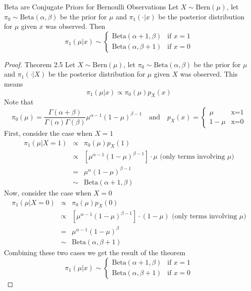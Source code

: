 \documentclass[11pt,a4paper]{article}
\begin{document}
  \begin{theorem}{Beta are Conjugate Priors for Bernoulli Observations}
    Let $X\sim\text{Bern}(\mu)$, let $\pi_0\sim\text{Beta}(\alpha,\beta)$ be the prior for $\mu$ and $\pi_1(\cdot|x)$ be the posterior distribution for $\mu$ given $x$ was observed. Then
    \[ \pi_1(\mu|x)\sim\begin{cases}\text{Beta}(\alpha+1,\beta)&\text{if }x=1\\\text{Beta}(\alpha,\beta+1)&\text{if }x=0\end{cases} \]
  \end{theorem}

  \begin{proof}{Theorem 2.5}
    Let $X\sim\text{Bern}(\mu)$, let $\pi_0\sim\text{Beta}(\alpha,\beta)$ be the prior for $\mu$ and $\pi_1(\cdot|X)$ be the posterior distribution for $\mu$ given $X$ was observed. This means
    \[ \pi_1(\mu|x)\propto\pi_0(\mu)p_X(x) \]
    Note that
    \[ \pi_0(\mu)=\frac{\Gamma(\alpha+\beta)}{\Gamma(\alpha)\Gamma(\beta)}\mu^{\alpha-1}(1-\mu)^{\beta-1}\quad\text{and}\quad p_X(x)=\begin{cases}\mu&\text{x=1}\\1-\mu&\text{x=0}\end{cases} \]
    First, consider the case when $X=1$
    \[\begin{array}{rcl}
      \pi_1(\mu|X=1)&\propto&\pi_0(\mu)p_X(1)\\
      &\propto&[\mu^{\alpha-1}(1-\mu)^{\beta-1}]\cdot\mu\text{ (only terms involving $\mu$)}\\
      &=&\mu^\alpha(1-\mu)^{\beta-1}\\
      &\sim&\text{Beta}(\alpha+1,\beta)
    \end{array}\]
    Now, consider the case when $X=0$
    \[\begin{array}{rcl}
      \pi_1(\mu|X=0)&\propto&\pi_0(\mu)p_X(0)\\
      &\propto&[\mu^{\alpha-1}(1-\mu)^{\beta-1}]\cdot(1-\mu)\text{ (only terms involving $\mu$)}\\
      &=&\mu^{\alpha-1}(1-\mu)^{\beta}\\
      &\sim&\text{Beta}(\alpha,\beta+1)
    \end{array}\]
    Combining these two cases we get the result of the theorem
    \[ \pi_1(\mu|x)\sim\begin{cases}\text{Beta}(\alpha+1,\beta)&\text{if }x=1\\\text{Beta}(\alpha,\beta+1)&\text{if }x=0\end{cases} \]
    \proved
  \end{proof}
\end{document}
